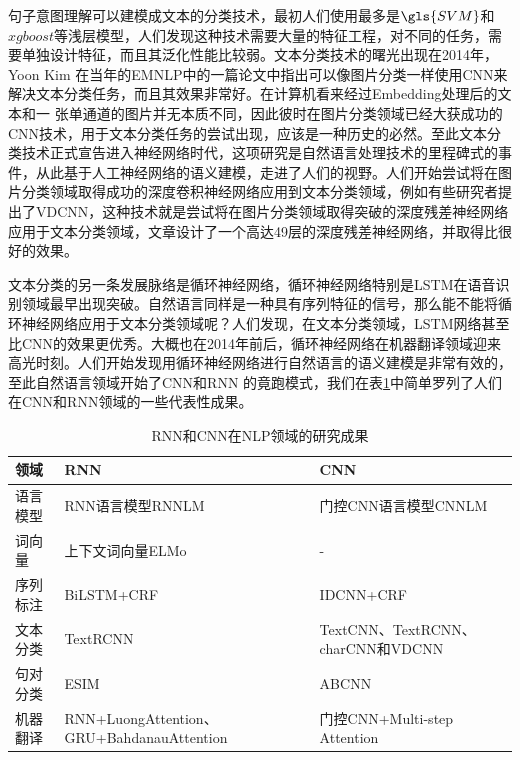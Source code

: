 \documentclass[twoside,a4paper,12pt]{book}%
\begin{document}
句子意图理解可以建模成文本的分类技术，最初人们使用最多是$\gls{SVM}$和$xgboost$等浅层模型，人们发现这种技术需要大量的特征工程，对不同的任务，需要单独设计特征，而且其泛化性能比较弱。文本分类技术的曙光出现在2014年，Yoon Kim 在当年的EMNLP中的一篇论文中指出可以像图片分类一样使用\gls{CNN}来解决文本分类任务，而且其效果非常好。在计算机看来经过Embedding处理后的文本和一
张单通道的图片并无本质不同，因此彼时在图片分类领域已经大获成功的\gls{CNN}技术，用于文本分类任务的尝试出现，应该是一种历史的必然。至此文本分类技术正式宣告进入神经网络时代，这项研究是自然语言处理技术的里程碑式的事件，从此基于人工神经网络的语义建模，走进了人们的视野。人们开始尝试将在图片分类领域取得成功的深度卷积神经网络应用到文本分类领域，例如有些研究者提出了\gls{VDCNN}，这种技术就是尝试将在图片分类领域取得突破的深度残差神经网络应用于文本分类领域，文章设计了一个高达49层的深度残差神经网络，并取得比很好的效果。

文本分类的另一条发展脉络是循环神经网络，循环神经网络特别是\gls{LSTM}在语音识别领域最早出现突破。自然语言同样是一种具有序列特征的信号，那么能不能将循环神经网络应用于文本分类领域呢？人们发现，在文本分类领域，\gls{LSTM}网络甚至比\gls{CNN}的效果更优秀。大概也在2014年前后，循环神经网络在机器翻译领域迎来高光时刻。人们开始发现用循环神经网络进行自然语言的语义建模是非常有效的，至此自然语言领域开始了\gls{CNN}和\gls{RNN} 的竟跑模式，我们在表\ref{tab:rnncnnhistory}中简单罗列了人们在\gls{CNN}和\gls{RNN}领域的一些代表性成果。
\begin{table} [h]
	    \begin{center}
    \begin{tabular}{p{50pt}p{150pt}p{160pt}}  %
        \hline    
        领域&\gls{RNN}&\gls{CNN}\\
        \hline    
        语言模型& \gls{RNN}语言模型\gls{RNNLM} & 门控\gls{CNN}语言模型\gls{CNNLM} \\
        \hline   
        词向量 & 上下文词向量ELMo & - \\
        \hline
        序列标注 & BiLSTM+\gls{CRF} & \gls{IDCNN}+\gls{CRF} \\
        \hline
        文本分类 &TextRCNN & TextCNN、TextRCNN、charCNN和\gls{VDCNN} \\
        \hline
        句对分类& ESIM & ABCNN \\
        \hline
        机器翻译 & \gls{RNN}+LuongAttention、\gls{GRU}+BahdanauAttention & 门控CNN+Multi-step Attention \\
        \hline
    \end{tabular}
    \caption{RNN和CNN在NLP领域的研究成果}  \label{tab:rnncnnhistory}
    \end{center}
\end{table}  
\end{document}
